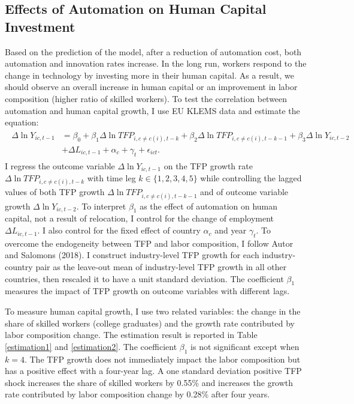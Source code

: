\documentclass[12pt]{article}
\begin{document}
\subsection{Effects of Automation on Human Capital Investment}
Based on the prediction of the model, after a reduction of automation cost, both automation and innovation rates increase. In the long run, workers respond to the change in technology by investing more in their human capital. As a result, we should observe an overall increase in human capital or an improvement in labor composition (higher ratio of skilled workers). To test the correlation between automation and human capital growth, I use EU KLEMS data and estimate the equation:
\begin{align}
\begin{split}
 \Delta \ln Y_{i c, t-1} &=\beta_{0}+\beta_{1} \Delta \ln TFP_{i, c \neq c(i), t-k} +\beta_{2} \Delta \ln TFP_{i, c \neq c(i), t-k-1}+\beta_{3} \Delta \ln Y_{i c, t-2}\\
 &+\Delta L_{i c, t-1}+\alpha_{c}+\gamma_{t}+\epsilon_{ict}.
 \end{split}
\end{align}
I regress the outcome variable $\Delta \ln Y_{i c, t-1}$ on the TFP growth rate $\Delta \ln TFP_{i, c \neq c(i), t-k}$ with time leg $k \in \{1,2,3,4,5\}$ while controlling the lagged values of both TFP growth $\Delta \ln TFP_{i, c \neq c(i), t-k-1}$ and of outcome variable growth $\Delta \ln Y_{ic, t-2}$. To interpret $\beta_{1}$ as the effect of automation on human capital, not a result of relocation, I control for the change of employment $\Delta L_{i c, t-1}$. I also control for the fixed effect of country $\alpha_{c}$ and year $\gamma_{t}$. To overcome the endogeneity between TFP and labor composition, I follow Autor and Salomons (2018)\nocite{AutorSalomons2018}. I construct industry-level TFP growth for each industry-country pair as the leave-out mean of industry-level TFP growth in all other countries, then rescaled it to have a unit standard deviation. The coefficient $\beta_{1}$ measures the impact of TFP growth on outcome variables with different lags. 

To measure human capital growth, I use two related variables: the change in the share of skilled workers (college graduates) and the growth rate contributed by labor composition change. The estimation result is reported in Table \ref{estimation1} and \ref{estimation2}. The coefficient $\beta_{1}$ is not significant except when $k=4$. The TFP growth does not immediately impact the labor composition but has a positive effect with a four-year lag. A one standard deviation positive TFP shock increases the share of skilled workers by 0.55\% and increases the growth rate contributed by labor composition change by 0.28\% after four years. 
\end{document}

